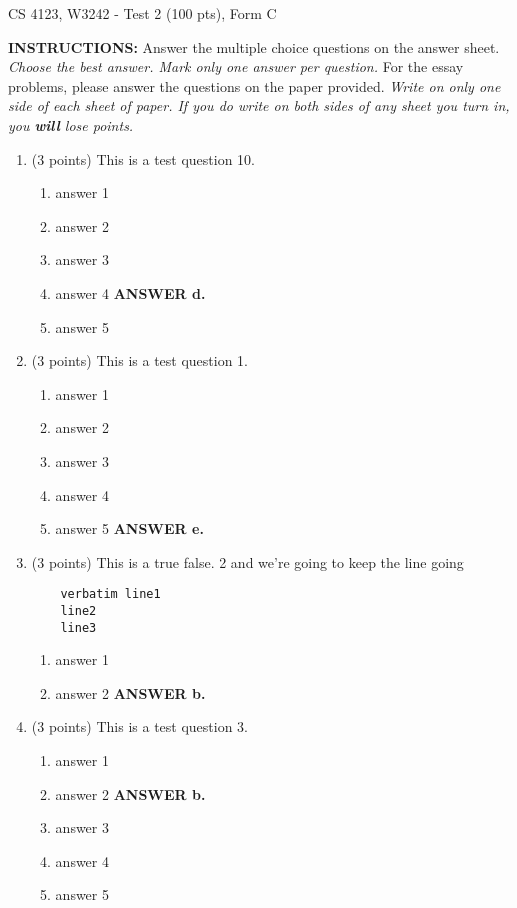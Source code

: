 \documentclass{article}
\newcommand{\ans}[1]{ \ifnum\showans=1 {\bf ANSWER #1.} \fi }
\begin{document}
{ \Large
\begin{center}
CS 4123, W3242 - Test 2 (100 pts), Form C
\end{center}
}

\vspace{.1in}

\noindent
{\Large\bf INSTRUCTIONS:} Answer the multiple choice questions on the
answer sheet.  {\em Choose the best answer.  Mark only one answer per
question.}  For the essay problems, please answer the questions on the
paper provided.  {\em Write on only one side of each sheet of paper.
If you do write on both sides of any sheet you turn in, you {\bf will}
lose points.}

\vspace{.1in}

\begin{enumerate}

\item (3 points) This is a test question 10.
  \begin{enumerate}
  \item answer 1
  \item answer 2
  \item answer 3
  \item answer 4  \ans{d}
  \item answer 5
  \end{enumerate}

\item (3 points) This is a test question 1.
  \begin{enumerate}
  \item answer 1
  \item answer 2
  \item answer 3
  \item answer 4
  \item answer 5  \ans{e}
  \end{enumerate}

\item (3 points) This is a true false. 2
and we're going to keep the line going
\begin{verbatim}
    verbatim line1
    line2
    line3
\end{verbatim}
  \begin{enumerate}
  \item answer 1
  \item answer 2  \ans{b}
  \end{enumerate}

\item (3 points) This is a test question 3.
  \begin{enumerate}
  \item answer 1
  \item answer 2  \ans{b}
  \item answer 3
  \item answer 4
  \item answer 5
  \end{enumerate}


\end{enumerate}
\end{document}
